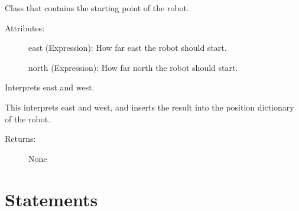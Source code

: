 \documentclass[letterpaper,10pt,english]{sphinxmanual}
\begin{document}
\begin{fulllineitems}
\label{\detokenize{robol:robol_lang.robol.Start}}
\sphinxAtStartPar
Class that contains the starting point of the robot.
\begin{description}
\item[{Attributes:}] \leavevmode
\sphinxAtStartPar
east (Expression): How far east the robot should start.

\sphinxAtStartPar
north (Expression): How far north the robot should start.

\end{description}

\begin{fulllineitems}
\label{\detokenize{robol:robol_lang.robol.Start.interpret}}
\sphinxAtStartPar
Interprets east and west.

\sphinxAtStartPar
This interprets east and west, and inserts the result into the position
dictionary of the robot.
\begin{description}
\item[{Returns:}] \leavevmode
\sphinxAtStartPar
None

\end{description}

\end{fulllineitems}


\end{fulllineitems}



\chapter{Statements}
\label{\detokenize{statements:module-robol_lang.statements}}\label{\detokenize{statements:statements}}\label{\detokenize{statements::doc}}
\end{document}
